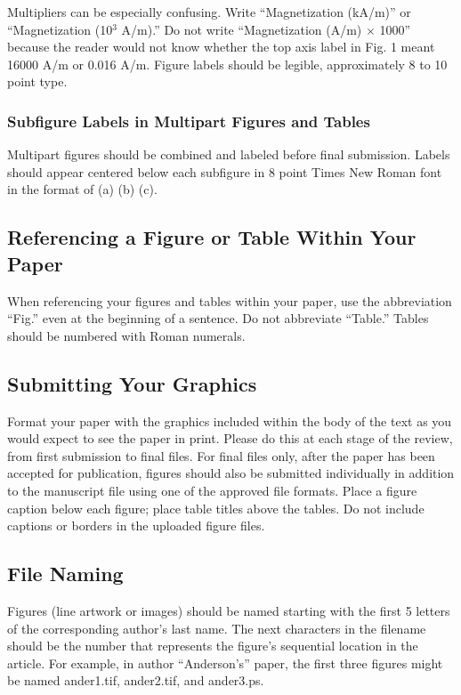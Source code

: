 \documentclass[journal,twoside,web]{ieeecolor}
\begin{document}
Multipliers can be especially confusing. Write ``Magnetization (kA/m)'' or
``Magnetization (10$^{3}$ A/m).'' Do not write ``Magnetization
(A/m)$\,\times\,$1000'' because the reader would not know whether the top
axis label in Fig. 1 meant 16000 A/m or 0.016 A/m. Figure labels should be
legible, approximately 8 to 10 point type.

\subsubsection{Subfigure Labels in Multipart Figures and Tables}
Multipart figures should be combined and labeled before final submission.
Labels should appear centered below each subfigure in 8 point Times New
Roman font in the format of (a) (b) (c).

\subsection{Referencing a Figure or Table Within Your Paper}
When referencing your figures and tables within your paper, use the
abbreviation ``Fig.'' even at the beginning of a sentence. Do not abbreviate
``Table.'' Tables should be numbered with Roman numerals.

\subsection{Submitting Your Graphics}
Format your paper with the graphics included within the body of the text
as you would expect to see the paper in print. Please do this at each stage of the review,
from first submission to final files. For final files only, after the paper has been accepted
for publication, figures should also be submitted individually in addition to the manuscript
file using one of the approved file formats. Place a figure caption below each figure;
place table titles above the tables. Do not include captions or borders in the uploaded figure files.

\subsection{File Naming}
Figures (line artwork or images) should be named starting with the
first 5 letters of the corresponding author's last name. The next characters in the
filename should be the number that represents the figure's sequential
location in the article. For example, in author ``Anderson's'' paper,
the first three figures might be named ander1.tif, ander2.tif, and ander3.ps.
\end{document}
